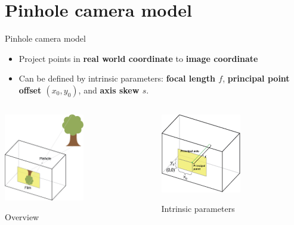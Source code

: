\documentclass{beamer}
\begin{document}
\section{Pinhole camera model}
\begin{frame}{Pinhole camera model}
    \begin{itemize}
        \item Project points in \textbf{real world coordinate} to \textbf{image coordinate}
        \item Can be defined by intrinsic parameters: \textbf{focal length $f$}, \textbf{principal point offset $(x_0,y_0)$}, and \textbf{axis skew $s$}.
    \end{itemize}
    \bigskip
    \begin{columns}
        \begin{column}{.4\linewidth}\centering
        \includegraphics[width=3.5cm]{pinhole_overview.png}\par 
        Overview \cite{noauthor_perspective_nodate}
        \end{column}
        \begin{column}{.4\linewidth}\centering
        \includegraphics[width=3.5cm]{pinhole_description_mod.jpg}\par 
        Intrinsic parameters \cite{noauthor_perspective_nodate}
        \end{column}
    \end{columns}
\end{frame}
\end{document}
